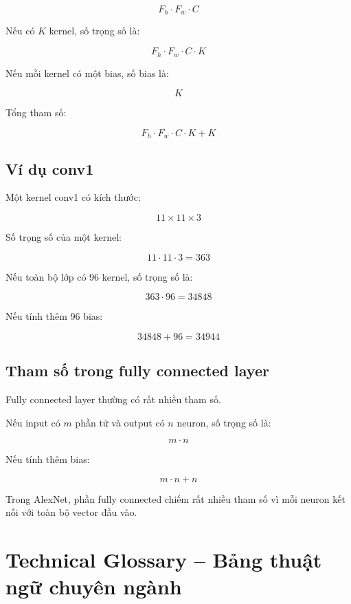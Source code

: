 \[
    F_h\cdot F_w\cdot C
\]

Nếu có $K$ kernel, số trọng số là:

\[
    F_h\cdot F_w\cdot C\cdot K
\]

Nếu mỗi kernel có một bias, số bias là:

\[
    K
\]

Tổng tham số:

\[
    F_h\cdot F_w\cdot C\cdot K + K
\]

\subsection{Ví dụ conv1}

Một kernel conv1 có kích thước:

\[
    11\times11\times3
\]

Số trọng số của một kernel:

\[
    11\cdot11\cdot3=363
\]

Nếu toàn bộ lớp có 96 kernel, số trọng số là:

\[
    363\cdot96=34848
\]

Nếu tính thêm 96 bias:

\[
    34848+96=34944
\]

\subsection{Tham số trong fully connected layer}

Fully connected layer thường có rất nhiều tham số.

Nếu input có $m$ phần tử và output có $n$ neuron, số trọng số là:

\[
    m\cdot n
\]

Nếu tính thêm bias:

\[
    m\cdot n+n
\]

\begin{ghinho}
Trong AlexNet, phần fully connected chiếm rất nhiều tham số vì mỗi neuron kết nối với toàn bộ vector đầu vào.
\end{ghinho}

\section{Technical Glossary -- Bảng thuật ngữ chuyên ngành}

